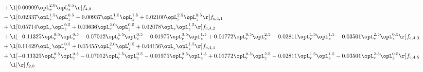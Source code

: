 \begin{alignat}{2}
& + \l[  0.00909 \opL_r^{2.0} \opL_z^{0.5}  \r] f_{4,0} \nonumber \\ 
& - \l[  0.02337 \opL_r^{1.5} \opL_z^{0.5} +  0.00937 \opL_r^{1.5} \opL_z^{1.5} +  0.02100 \opL_r^{2.5} \opL_z^{0.5}  \r] f_{c,4,1} \nonumber \\ 
& + \l[  0.05714 \opL_r \opL_z^{0.5} +  0.03636 \opL_r^{2.0} \opL_z^{0.5} +  0.02078 \opL_r \opL_z^{1.5}  \r] f_{c,4,2} \nonumber \\ 
& + \l[  -0.11325 \opL_r^{0.5} \opL_z^{0.5}   -0.07012 \opL_r^{1.5} \opL_z^{0.5}   -0.01975 \opL_r^{0.5} \opL_z^{1.5} +  0.01772 \opL_r^{0.5} \opL_z^{2.5}   -0.02811 \opL_r^{1.5} \opL_z^{1.5}   -0.03501 \opL_r^{2.5} \opL_z^{0.5}  \r] f_{c,4,3} \nonumber \\ 
& + \l[  0.11429 \opL_r \opL_z^{0.5} +  0.05455 \opL_r^{2.0} \opL_z^{0.5} +  0.04156 \opL_r \opL_z^{1.5}  \r] f_{c,4,4} \nonumber \\ 
& + \l[  -0.11325 \opL_r^{0.5} \opL_z^{0.5}   -0.07012 \opL_r^{1.5} \opL_z^{0.5}   -0.01975 \opL_r^{0.5} \opL_z^{1.5} +  0.01772 \opL_r^{0.5} \opL_z^{2.5}   -0.02811 \opL_r^{1.5} \opL_z^{1.5}   -0.03501 \opL_r^{2.5} \opL_z^{0.5}  \r] f_{c,4,5} \nonumber \\ 
& - \l[  \r] f_{2,0} \nonumber \\ 
\end{alignat} 



